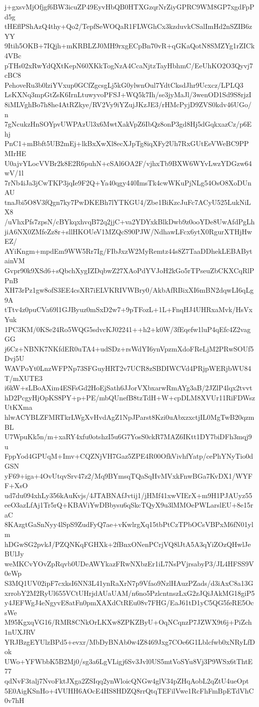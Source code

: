 j+gxsvMjOfjgf6BW3icuZP49EyvHbQB0HTXGzqrNrZiyGPRC9WM8GP7xgdFpPd5g
tHEflPShAzQ4thy+Qo2/TepfSeWOQaR1FLWGhCx3kzduvkCSalImHd2nSZIB6zYY
9Itih5OKB+7IQjh+mKRBLZJ0MH9rxgECpBn70vR+qGKaQotN8SMZYg1rZICk4VBc
pTHs02xRwYdQXtKepN60XKkTogNzA4CcaNjtzTayHbhmC/EeUhKO2O3Qyvj7cBC8
PehoveRu3b0lziYVxup0GCfZgcsgLj5kG0ylwnOul7YdtCksdJhr9Ucxcz/LPLQ3
LsKXNq3mpGtZsK6IrnLtuwyvoPFSJ+WQ5k7Ih/se3jyMaJl/3wenOD1Sd9S8rjzI
8iMLVghBo7h8he4AtRZkye/RV2Vy9iYZujJKzJE3/rHMcPyjD9ZVS0kdv46UGo/n
7gNcukzHnSOYpvUWPAzUl3x6MwtXakVpZ6IbQz8onP3gd8Hj5dGqkxazCz/p6Ehj
PnC1+mBbft5UB2mEj+lkBxXwXl8ecXJpTg8iqXFy2Uh7RxGUtEeVWeBC9PPMIrHE
U0ajvYLocVVBr2k8E2R6puhN+cSAl6OA2F/vjhxTb9BXW6WYvLwzYDGzw64wV/1l
7rNb4iJa3jCwTKP3jqIe9F2Q+Ya40qgy440ImsTk4cwWKuPjNLg54OsO8XoDUnAU
tnaJbi5O8V3fQgn7ky7PwDKEBh7lYTKGU4/Zbe1BiKzcJuFc7ACyU525LukNiLX8
/uVhxPfs7zpsN/cBYkqxhvqB72q2jjC+va2YDYxkBlkDwb9z0ooYDe8UwAfdPgLh
jiA6NX0ZMfeZz8r+sllHKOUeV1MZQcS90PJW/NdhawLFcx6ytX0RgurXTHjHwEZ/
AYiKngm+mpdEm9WW5Rr7Ig/FIbJxzW2MyRemtz44s8Z7TaaDDhekLEBABytainVM
Gvpr90k9XSd6+sQbchXygIZDqbwZ27XAoPdYVJoH2kGo5rTPseuZbCKXCqRlPPnB
XH73rPz1gw8ofS3EE4csXR7iELVKRIVWBry0/AkbAfRBixXI6mBN2dqwLI6qLg9A
tTtv4z0puCVa69l1GJByuz0mSxD2w7+9pTFozL+1L+FnqHJ4UHRxaMvk/HsVxYuk
1PC3KM/0KSe24Ro5WQG5sdvcKJ02241++h2+k0W/3fEqefw1luP4qEfc4Z2vagGG
j6Cz+NBNK7NKfdER0uTA4+udSDz+rsWdYI6ynVpzmXdoFReLjM2PRwSOUf5Dvj5U
WAVPoYt0LnzWFPNp73SFGuyHRT2v7UCR8zSBDIWCVd4PRjpWERjbWU84T/mXUTE3
i6kW+sLBoAXim4ESFsGd2HoEjSath6JJorVXbxarwRmAYg3aB/2JZlP4lqx2tvvt
hD2PcgyHjOpKS8PY+p+PE/mbQUnefB8tzTdH+W+cpDLM8XVUr11RiFDWszUtKXma
hlwACYBLZFMRTkrLWgXvHvdAgZ1NpJParst8Kzi0uAbxzxctjIL0MgTwB20qzmBL
U7WpuKk5n/m+xaRY4xfu0otshzI5u6G7YosS0ckR7MAZ6IKtt1DY7biDFh3mqj9u
FppYod4GPUqM+Imv+CQZNjVH7Gaz5ZPE4R00OfkVivhfYatp/cePhYNyTio0dGSN
yF69+iga+4OvUtqvSrv47z2/Mq9BYmsqTQaSqHvMVxkFnwBGa7KvDX1/WYFF+XsO
ud7du094xhLy356kAuKvjs/4JTABNAfJvtij1/jHMf41xwVIErX+m9H1PJAUyz55
eeO3azLfAj1Tr5rQ+KBAViYwDBbysu6qSkcTQyX9u3lMMOePWLarslEU+8e15raC
8KAzgtGaSnNyy4lSpS9ZudFyQ7ae+vKwlrgXq15tbPtCzTPbOCsVBPxM6fN01ylm
hDGwSG2pvkJ/PZQNKqFGHXk+2fBnxONenPCrjVQ8lJtA5A3qYiZOzQHwlJeBUlJy
weMKCvYOvZpRqvb0UDeAWYkazFRwNXbzEr1iL7NsPVjrsabyP3/JL4HFSS9V0eWp
S3MQ1UV02ipF7cxksI6NN3L41ynRaXrN7p9Vfao9NzlHAuzPZads/d3iAxC8a13G
xrrobY2M2RyUl655VCtUHrjdAUaUAM/n6no5PzlcntnszLxG2zJQiJAkMG18giP5
y4JEFWgJ4eNgyvE8atFn0pmXAXdCtREu08v7FHG/EaJ61tD1yC5QG5feRE5OcsWe
M95KgxqVG16/RMR8CNkOrLKXw8ZPKZByU+OqNCqnzP7JZWX9t6j+PiZch1nUXJRV
YRJBzgEYUlzBPd5+evxr/MbDyBNAb0w4Z8469Jxg7COe6G1Lblcfwb0xNRyLfDok
UWo+YFWbbK5B2Mj0/sg3a6LgVLigj6Sv3Jvl0US5mtVoSYu8Vj3P9WSx6tThtE77
qdNvF3talj7NvoFktJXga2ZSIqq2ynWloicQNGw4glV34pZHqAobL2qZtU4ueOpt
5E0AigKSnHo+4VUHH6AOcE4HS8HDZQ8rrQtqTEFilVwe1RcFhFmBpETdVhC0v7hH
